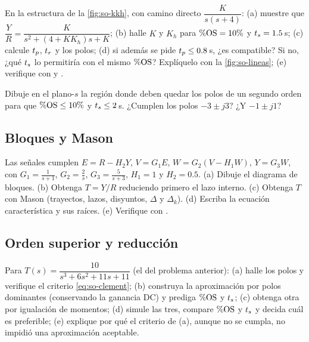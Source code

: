 \begin{problema}\label{prob:so-diseno}
En la estructura de la \cref{fig:so-kkh}, con camino directo $\dfrac{K}{s(s+4)}$: (a) muestre que $\dfrac YR=\dfrac{K}{s^2+(4+KK_h)s+K}$; (b) halle $K$ y $K_h$ para $\%\mathrm{OS}=10\%$ y $t_s=1.5$\,s; (c) calcule $t_p$, $t_r$ y los polos; (d) si además se pide $t_p\leq0.8$\,s, ¿es compatible? Si no, ¿qué $t_s$ lo permitiría con el mismo $\%\mathrm{OS}$? Explíquelo con la \cref{fig:so-lineas}; (e) \etiquetaM{} verifique con  y .
\end{problema}

\begin{problema}\label{prob:so-region}
Dibuje en el plano-$s$ la región donde deben quedar los polos de un segundo orden para que $\%\mathrm{OS}\leq10\%$ y $t_s\leq2$\,s. ¿Cumplen los polos $-3\pm j3$? ¿Y $-1\pm j1$?
\end{problema}

\subsection*{Bloques y Mason}

\begin{problema}\label{prob:so-multilazo}
Las señales cumplen $E=R-H_2Y$, $V=G_1E$, $W=G_2(V-H_1W)$, $Y=G_3W$, con $G_1=\frac1{s+1}$, $G_2=\frac2s$, $G_3=\frac5{s+3}$, $H_1=1$ y $H_2=0.5$. (a) Dibuje el diagrama de bloques. (b) Obtenga $T=Y/R$ reduciendo primero el lazo interno. (c) Obtenga $T$ con Mason (trayectos, lazos, disyuntos, $\Delta$ y $\Delta_k$). (d) Escriba la ecuación característica y sus raíces. (e) \etiquetaM{} Verifique con .
\end{problema}

\subsection*{Orden superior y reducción}

\begin{problema}\label{prob:so-tres}
Para $T(s)=\dfrac{10}{s^3+6s^2+11s+11}$ (el del problema anterior): (a) halle los polos y verifique el criterio \eqref{eq:so-clement}; (b) construya la aproximación por polos dominantes (conservando la ganancia DC) y prediga $\%\mathrm{OS}$ y $t_s$; (c) obtenga otra por igualación de momentos; (d) \etiquetaM{} simule las tres, compare $\%\mathrm{OS}$ y $t_s$ y decida cuál es preferible; (e) explique por qué el criterio de (a), aunque no se cumpla, no impidió una aproximación aceptable.
\end{problema}

